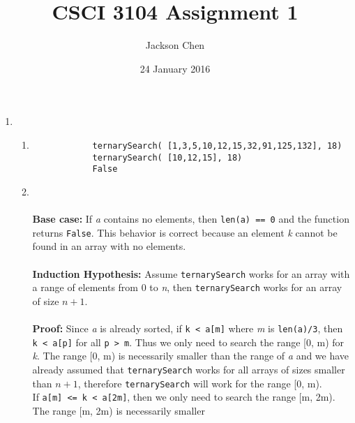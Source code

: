 \documentclass[11pt, letterpaper]{article}
\begin{document}
  \title{CSCI 3104 Assignment 1}
    \date{24 January 2016}
    \author{Jackson Chen}
    \maketitle

  \begin{enumerate}
    \item
      \begin{enumerate}
        \item
          \begin{lstlisting}
            ternarySearch( [1,3,5,10,12,15,32,91,125,132], 18)
            ternarySearch( [10,12,15], 18)
            False
          \end{lstlisting}

        \item
           \\ \\
          \textbf{Base case:} If \textit{a} contains no elements, then \texttt{len(a) == 0} and the function returns \texttt{False}.
            This behavior is correct because an element \textit{k} cannot be found in an array with no elements. \\ \\
          \textbf{Induction Hypothesis:} Assume \texttt{ternarySearch} works for an array with a range of elements from 0 to
            \textit{n}, then \texttt{ternarySearch} works for an array of size $n+1$. \\ \\
          \textbf{Proof:} Since \textit{a} is already sorted, if \texttt{k < a[m]} where \textit{m} is \texttt{len(a)/3}, then
            \texttt{k < a[p]} for all \texttt{p > m}. Thus we only need to search the range [0, m) for \textit{k}. The
            range [0, m) is necessarily smaller than the range of \textit{a} and we have already assumed that \texttt{ternarySearch}
            works for all arrays of sizes smaller than $n+1$, therefore \texttt{ternarySearch} will work for the range [0, m). \\
            If \texttt{a[m] <= k < a[2m]}, then we only need to search the range [m, 2m). The range [m, 2m) is necessarily smaller

\end{enumerate}
\end{enumerate}
\end{document}
